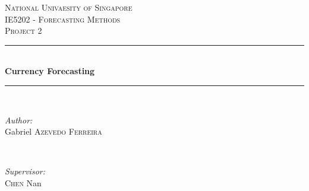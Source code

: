 \begin{titlepage}

\newcommand{\HRule}{\rule{\linewidth}{0.5mm}} %

\center %
	 

\textsc{\LARGE National Univaesity of Singapore}\\[1.5cm] %
\textsc{\Large IE5202 - Forecasting Methods}\\[0.5cm] %
\textsc{\large Project 2}\\[0.5cm] %


\HRule \\[0.4cm]
{ \huge \bfseries Currency Forecasting}\\[0.4cm] %
\HRule \\[1.5cm]
	 

\begin{minipage}{0.4\textwidth}
\begin{flushleft} \large
\emph{Author:}\\
Gabriel \textsc{Azevedo Ferreira} %
\end{flushleft}
\end{minipage}
~
\begin{minipage}{0.4\textwidth}
\begin{flushright} \large
\emph{Supervisor:} \\
\textsc{Chen} Nan%
\end{flushright}
\end{minipage}\\[2cm]



\end{titlepage}
